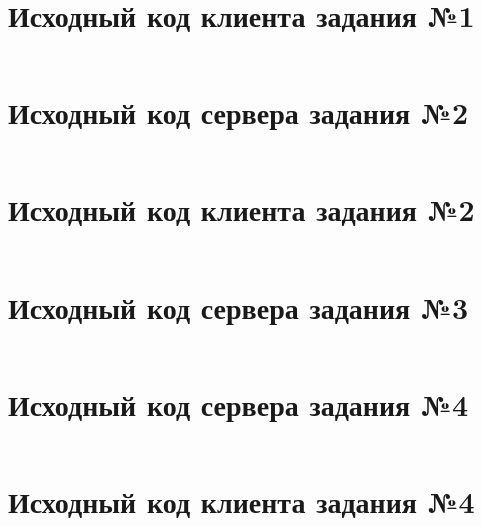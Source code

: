 \documentclass[a4paper, 14pt]{extarticle}
\newenvironment{code}{\captionsetup{type=listing}}{}
\begin{document}
\begin{code}
  \inputminted{python}{../task-1/server.py}
\end{code}

\newpage

\section{Исходный код клиента задания №1}
\label{app:task-1:client.py}

\begin{code}
  \inputminted{python}{../task-1/client.py}
\end{code}

\newpage

\section{Исходный код сервера задания №2}
\label{app:task-2:server.py}

\begin{code}
  \inputminted{python}{../task-2/server.py}
\end{code}

\newpage

\section{Исходный код клиента задания №2}
\label{app:task-2:client.py}

\begin{code}
  \inputminted{python}{../task-2/client.py}
\end{code}

\newpage

\section{Исходный код сервера задания №3}
\label{app:task-3:server.py}

\begin{code}
  \inputminted{python}{../task-3/server.py}
\end{code}

\newpage

\section{Исходный код сервера задания №4}
\label{app:task-4:server.py}

\begin{code}
  \inputminted{python}{../task-4/server.py}
\end{code}

\newpage

\section{Исходный код клиента задания №4}
\label{app:task-4:client.py}

\begin{code}
  \inputminted{python}{../task-4/client.py}
\end{code}
\end{document}
